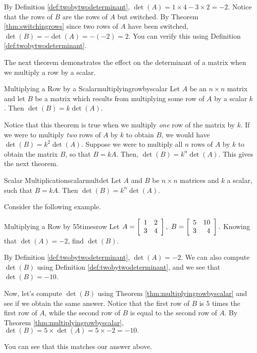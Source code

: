 \begin{solution}
By Definition \ref{def:twobytwodeterminant}, 
$\det \left(A\right) = 1 \times 4 - 3 \times 2 = -2$. 
Notice that the rows of $B$ are the rows of $A$ but switched. 
By Theorem \ref{thm:switchingrows} since two rows of $A$ have been switched,
$\det \left(B\right) = - \det \left(A\right) = - \left(-2\right) = 2$.
You can verify this using Definition \ref{def:twobytwodeterminant}. 
\end{solution}

The next theorem demonstrates the effect on the determinant of a matrix when we multiply
a row by a scalar.

\begin{theorem}{Multiplying a Row by a Scalar}{multiplyingrowbyscalar}
Let $A$ be an $n\times n$ matrix and let $B$ be a matrix
which results from multiplying some row of $A$ by a scalar $k$. Then $\det
\left( B\right) = k \det \left( A\right) $.
\end{theorem}

Notice that this theorem is true when we multiply {\em one\em} row of the matrix by $k$.
If we were to multiply {\em two\em} rows of $A$ by $k$ to obtain $B$, we would have
$\det \left(B\right) = k^2 \det \left(A\right)$.
Suppose we were to multiply all $n$ rows of $A$ by $k$ to obtain the matrix $B$, so that 
$B = kA$. Then, $\det \left(B\right) = k^n \det \left(A\right)$. This gives the next theorem.

\begin{theorem}{Scalar Multiplication}{scalarmultdet}
Let $A$ and $B$ be $n \times n$ matrices and $k$ a scalar, such that $B = kA$. Then $\det(B) = k^n \det(A)$.
\end{theorem}

Consider the following example.

\begin{example}{Multiplying a Row by 5}{5timesrow}
Let $A=\left[
\begin{array}{rr}
1 & 2 \\
3 & 4
\end{array}
\right] ,\ B=\left[
\begin{array}{rr}
5 & 10 \\
3 & 4
\end{array}
\right] .$ 
Knowing that $\det \left( A \right) =-2$, find  $\det \left( B \right) $.
\end{example}

\begin{solution} 
By Definition \ref{def:twobytwodeterminant}, $\det \left( A\right) =-2.$ We can also compute
$\det \left(B\right)$ using Definition \ref{def:twobytwodeterminant}, and we see that $\det \left(B\right) = -10$. 

Now, let's compute  $\det \left(B\right)$ using Theorem \ref{thm:multiplyingrowbyscalar} and see if we
obtain the same answer. Notice that the first row of $B$ is $5$ times the first row of $A$, while the
second row of $B$ is equal to the second row of $A$. 
By Theorem \ref{thm:multiplyingrowbyscalar}, 
$\det  \left( B \right) = 5 \times \det \left( A \right) = 5 \times -2 = -10.$

You can see that this matches our answer above.
\end{solution}

